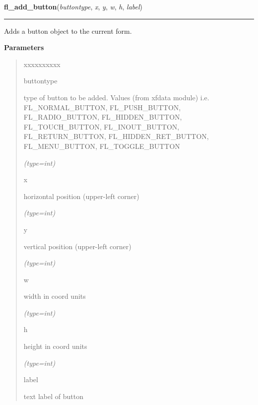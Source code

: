 \hspace{.8\funcindent}\begin{boxedminipage}{\funcwidth}

    \raggedright \textbf{fl\_add\_button}(\textit{buttontype}, \textit{x}, \textit{y}, \textit{w}, \textit{h}, \textit{label})

    \vspace{-1.5ex}

    \rule{\textwidth}{0.5\fboxrule}
\setlength{\parskip}{2ex}
    Adds a button object to the current form.

\setlength{\parskip}{1ex}
      \textbf{Parameters}
      \vspace{-1ex}

      \begin{quote}
        \begin{Ventry}{xxxxxxxxxx}

          \item[buttontype]

          type of button to be added. Values (from xfdata module) i.e. 
          FL\_NORMAL\_BUTTON, FL\_PUSH\_BUTTON, FL\_RADIO\_BUTTON, 
          FL\_HIDDEN\_BUTTON, FL\_TOUCH\_BUTTON, FL\_INOUT\_BUTTON, 
          FL\_RETURN\_BUTTON, FL\_HIDDEN\_RET\_BUTTON, FL\_MENU\_BUTTON, 
          FL\_TOGGLE\_BUTTON

            {\it (type=int)}

          \item[x]

          horizontal position (upper-left corner)

            {\it (type=int)}

          \item[y]

          vertical position (upper-left corner)

            {\it (type=int)}

          \item[w]

          width in coord units

            {\it (type=int)}

          \item[h]

          height in coord units

            {\it (type=int)}

          \item[label]

          text label of button


\end{Ventry}
\end{quote}
\end{boxedminipage}
